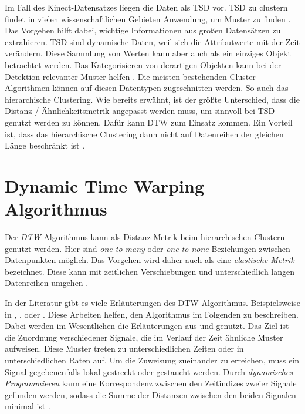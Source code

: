 Im Fall des Kinect-Datensatzes liegen die Daten als \ac{TSD} vor.
\ac{TSD} zu clustern findet in vielen wissenschaftlichen Gebieten Anwendung, um Muster zu finden \citep{aghabozorgi_time-series_2015}.
Das Vorgehen hilft dabei, wichtige Informationen aus großen Datensätzen zu extrahieren.
\ac{TSD} sind dynamische Daten, weil sich die Attributwerte mit der Zeit verändern.
Diese Sammlung von Werten kann aber auch als ein einziges Objekt betrachtet werden.
Das Kategorisieren von derartigen Objekten kann bei der Detektion relevanter Muster helfen \citep{aghabozorgi_time-series_2015}.
Die meisten bestehenden Cluster-Algorithmen können auf diesen Datentypen zugeschnitten werden.
So auch das hierarchische Clustering.
Wie bereits erwähnt, ist der größte Unterschied, dass die Distanz-/ Ähnlichkeitsmetrik angepasst werden muss,
um sinnvoll bei \ac{TSD} genutzt werden zu können.
Dafür kann \ac*{DTW} zum Einsatz kommen.
Ein Vorteil ist, dass das hierarchische Clustering dann
nicht auf Datenreihen der gleichen Länge beschränkt ist \citep{warren_liao_clustering_2005}.

\section{Dynamic Time Warping Algorithmus}
\label{3-DTW}
Der \emph{\ac{DTW}} Algorithmus kann als Distanz-Metrik beim hierarchischen Clustern genutzt werden.
Hier sind \emph{one-to-many} oder \emph{one-to-none} Beziehungen zwischen Datenpunkten möglich.
Das Vorgehen wird daher auch als eine \emph{elastische Metrik} bezeichnet.
Diese kann mit zeitlichen Verschiebungen und unterschiedlich langen Datenreihen umgehen \citep{aghabozorgi_time-series_2015}.

In der Literatur  gibt es viele Erläuterungen des \ac{DTW}-Algorithmus.
Beispielsweise in \citet{mohammadzade_dynamic_2021}, \citet{warren_liao_clustering_2005},
\citet{aghabozorgi_time-series_2015} oder \citet{yu_dynamic_2019}.
Diese Arbeiten helfen, den Algorithmus im Folgenden zu beschreiben.
Dabei werden im Wesentlichen die Erläuterungen aus \citet{mohammadzade_dynamic_2021} und \citet{warren_liao_clustering_2005} genutzt.
Das Ziel ist die Zuordnung verschiedener Signale,
die im Verlauf der Zeit ähnliche Muster aufweisen.
Diese Muster treten zu unterschiedlichen Zeiten oder in unterschiedlichen Raten auf.
Um die Zuweisung zueinander zu erreichen, muss ein Signal gegebenenfalls lokal gestreckt oder gestaucht werden.
Durch \emph{dynamisches Programmieren} kann eine Korrespondenz zwischen den Zeitindizes zweier Signale gefunden werden,
sodass die Summe der Distanzen zwischen den beiden Signalen minimal ist \citep{mohammadzade_dynamic_2021}.

